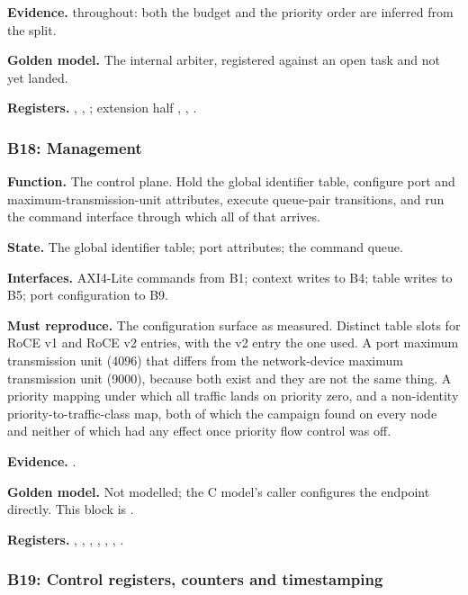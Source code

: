 \textbf{Evidence.} \evcal{} throughout: both the budget and the priority order
are inferred from the split.

\textbf{Golden model.} The internal arbiter, registered against an open task and
not yet landed.

{\raggedright
\textbf{Registers.} , ,
; extension half ,
, .\par}

\subsubsection{B18: Management}

\textbf{Function.} The control plane. Hold the global identifier table,
configure port and maximum-transmission-unit attributes, execute queue-pair
transitions, and run the command interface through which all of that arrives.

\textbf{State.} The global identifier table; port attributes; the command
queue.

\textbf{Interfaces.} AXI4-Lite commands from B1; context writes to B4; table
writes to B5; port configuration to B9.

\textbf{Must reproduce.} The configuration surface as measured. Distinct table
slots for RoCE v1 and RoCE v2 entries, with the v2 entry the one used. A port
maximum transmission unit (4096) that differs from the network-device maximum
transmission unit (9000), because both exist and they are not the same thing.
A priority mapping under which all traffic lands on priority zero, and a
non-identity priority-to-traffic-class map, both of which the campaign found on
every node and neither of which had any effect once priority flow control was
off.

\textbf{Evidence.} \evdoc{}.

\textbf{Golden model.} Not modelled; the C model's caller configures the
endpoint directly. This block is \evdecl{}.

{\raggedright
\textbf{Registers.} , ,
, , ,
, .\par}

\subsubsection{B19: Control registers, counters and timestamping}

